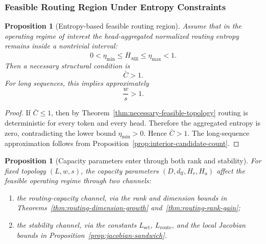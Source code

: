 \documentclass{article}
\theoremstyle{plain}
\newtheorem{proposition}[theorem]{Proposition}
\theoremstyle{definition}
\theoremstyle{remark}
\begin{document}
\subsubsection{Feasible Routing Region Under Entropy Constraints}
\label{sec:tier-b-feasible-routing}

\begin{proposition}[Entropy-based feasible routing region]
\label{prop:entropy-feasible-routing}
Assume that in the operating regime of interest the head-aggregated normalized routing entropy remains inside a nontrivial interval:
\begin{equation}
\label{eq:entropy-interval-feasible}
0<\eta_{\min}\le \overline H_{\mathrm{agg}} \le \eta_{\max}<1.
\end{equation}
Then a necessary structural condition is
\begin{equation}
\label{eq:entropy-feasible-cbar}
\bar{C}>1.
\end{equation}
For long sequences, this implies approximately
\begin{equation}
\label{eq:entropy-feasible-ws}
\frac{w}{s}>1.
\end{equation}
\end{proposition}

\begin{proof}
If $\bar{C}\le 1$, then by Theorem~\ref{thm:necessary-feasible-topology} routing is deterministic for every token and every head. Therefore the aggregated entropy is zero, contradicting the lower bound $\eta_{\min}>0$. Hence $\bar{C}>1$. The long-sequence approximation follows from Proposition~\ref{prop:interior-candidate-count}.
\end{proof}

\begin{proposition}[Capacity parameters enter through both rank and stability]
\label{prop:capacity-stability}
For fixed topology $(L,w,s)$, the capacity parameters $(D,d_{\mathrm{ff}},H_r,H_a)$ affect the feasible operating regime through two channels:
\begin{enumerate}
    \item the routing-capacity channel, via the rank and dimension bounds in Theorems~\ref{thm:routing-dimension-growth} and~\ref{thm:routing-rank-gain};
    \item the stability channel, via the constants $L_{\mathrm{set}}$, $L_{\mathrm{route}}$, and the local Jacobian bounds in Proposition~\ref{prop:jacobian-sandwich}.
\end{enumerate}
\end{proposition}
\end{document}
